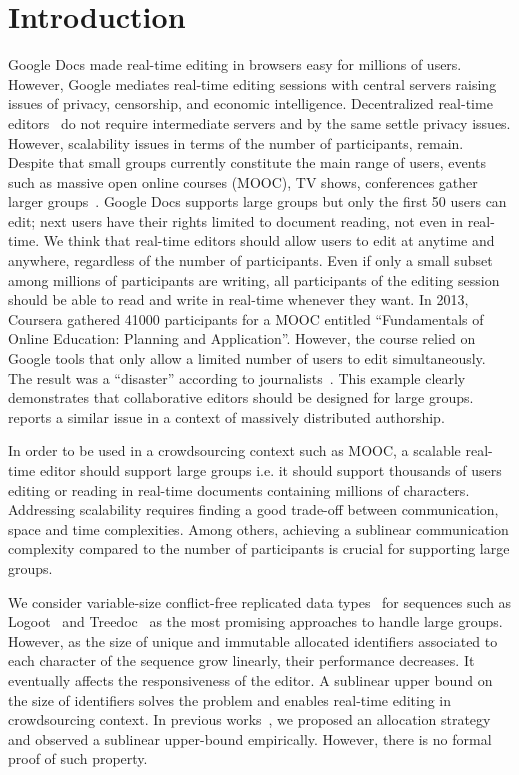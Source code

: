 

\section{Introduction}

Google Docs made real-time editing in browsers easy for millions of
users. However, Google mediates real-time editing sessions with
central servers raising issues of privacy, censorship, and economic
intelligence. Decentralized real-time editors~\cite{oster2006data,
  sun1998operational, sun2009contextbased} do not require intermediate
servers and by the same settle privacy issues. However, scalability
issues in terms of the number of participants, remain.  Despite that
small groups currently constitute the main range of users, events such
as massive open online courses (MOOC), TV shows, conferences gather
larger groups~\cite{breslow2013studying}.  Google Docs supports large
groups but only the first 50 users can edit; next users have their
rights limited to document reading, not even in real-time.  We think
that real-time editors should allow users to edit at anytime and
anywhere, regardless of the number of participants. Even if only a
small subset among millions of participants are writing, all
participants of the editing session should be able to read and write
in real-time whenever they want. In 2013, Coursera gathered 41000
participants for a MOOC entitled ``Fundamentals of Online Education:
Planning and Application''. However, the course relied on Google tools
that only allow a limited number of users to edit simultaneously.  The result
was a ``disaster'' according to journalists~\cite{slate13,wp13}. This example
clearly demonstrates that collaborative editors should be designed for large
groups. \cite{chi12} reports a similar issue in a context of massively
distributed authorship.

In order to be used in a crowdsourcing context such as MOOC, a
scalable real-time editor should support large groups i.e. it should
support thousands of users editing or reading in real-time documents
containing millions of characters. Addressing scalability requires
finding a good trade-off between communication, space and time
complexities. Among others, achieving a sublinear communication
complexity compared to the number of participants is crucial for
supporting large groups.

We consider variable-size conflict-free replicated data
types~\cite{shapiro2011comprehensive} for sequences such as
Logoot~\cite{weiss2010logootundo} and Treedoc~\cite{preguica2009commutative} as
the most promising approaches to handle large groups. However, as the size of
unique and immutable allocated identifiers associated to each character of the
sequence grow linearly, their performance decreases. It eventually affects the
responsiveness of the editor. A sublinear upper bound on the size of identifiers
solves the problem and enables real-time editing in crowdsourcing context.  In
previous works~\cite{nedelec2013concurrency, nedelec2013lseq}, we proposed an
allocation strategy and observed a sublinear upper-bound empirically. However,
there is no formal proof of such property.

